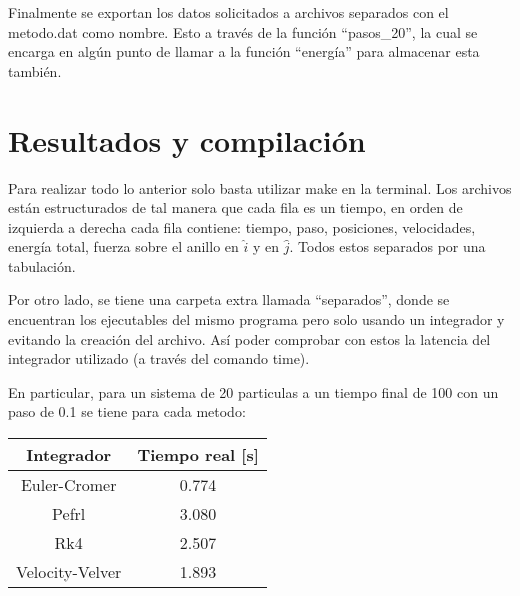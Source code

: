 \documentclass[12pt]{article}
\begin{document}
Finalmente se exportan los datos solicitados a archivos separados con el metodo.dat como nombre. Esto a través de la función ``pasos\_20'', la cual se encarga en algún punto de llamar a la función ``energía'' para almacenar esta también.

\section{Resultados y compilación}
Para realizar todo lo anterior solo basta utilizar make en la terminal. Los archivos están estructurados de tal manera que cada fila es un tiempo, en orden de izquierda a derecha cada fila contiene: tiempo, paso, posiciones, velocidades, energía total, fuerza sobre el anillo en $\hat{i}$ y en $\hat{j}$. Todos estos separados por una tabulación.

Por otro lado, se tiene una carpeta extra llamada ``separados'', donde se encuentran los ejecutables del mismo programa pero solo usando un integrador y evitando la creación del archivo. Así poder comprobar con estos la latencia del integrador utilizado (a través del comando time).

En particular, para un sistema de 20 particulas a un tiempo final de 100 con un paso de 0.1 se tiene para cada metodo:

\begin{table}[h]
\centering
\begin{tabular}{|c|c|}
\hline
\textbf{Integrador} & \textbf{Tiempo real {[}s{]}} \\ \hline
Euler-Cromer        & 0.774                        \\ \hline
Pefrl               & 3.080                        \\ \hline
Rk4                 & 2.507                        \\ \hline
Velocity-Velver     & 1.893                        \\ \hline
\end{tabular}
\end{table}
\end{document}
